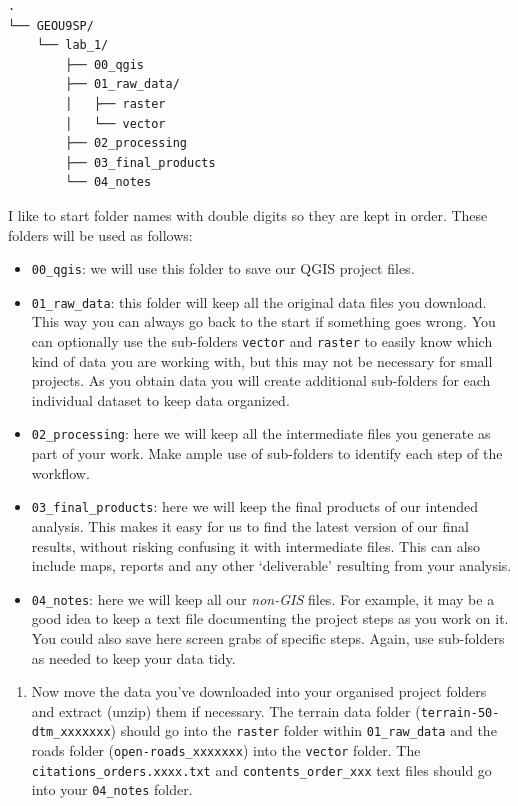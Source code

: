 \documentclass[
  letterpaper,
  DIV=11,
  numbers=noendperiod]{scrreprt}
\providecommand{\tightlist}{%
  \setlength{\itemsep}{0pt}\setlength{\parskip}{0pt}}\usepackage{longtable,booktabs,array}
\begin{document}
\begin{verbatim}
.
└── GEOU9SP/
    └── lab_1/
        ├── 00_qgis
        ├── 01_raw_data/
        │   ├── raster
        │   └── vector
        ├── 02_processing
        ├── 03_final_products
        └── 04_notes
\end{verbatim}

I like to start folder names with double digits so they are kept in
order. These folders will be used as follows:

\begin{itemize}
\item
  \texttt{00\_qgis}: we will use this folder to save our QGIS project
  files.
\item
  \texttt{01\_raw\_data}: this folder will keep all the original data
  files you download. This way you can always go back to the start if
  something goes wrong. You can optionally use the sub-folders
  \texttt{vector} and \texttt{raster} to easily know which kind of data
  you are working with, but this may not be necessary for small
  projects. As you obtain data you will create additional sub-folders
  for each individual dataset to keep data organized.
\item
  \texttt{02\_processing}: here we will keep all the intermediate files
  you generate as part of your work. Make ample use of sub-folders to
  identify each step of the workflow.
\item
  \texttt{03\_final\_products}: here we will keep the final products of
  our intended analysis. This makes it easy for us to find the latest
  version of our final results, without risking confusing it with
  intermediate files. This can also include maps, reports and any other
  `deliverable' resulting from your analysis.
\item
  \texttt{04\_notes}: here we will keep all our \emph{non-GIS} files.
  For example, it may be a good idea to keep a text file documenting the
  project steps as you work on it. You could also save here screen grabs
  of specific steps. Again, use sub-folders as needed to keep your data
  tidy.
\end{itemize}

\begin{enumerate}
\def\labelenumi{(\arabic{enumi})}
\setcounter{enumi}{8}
\tightlist
\item
  Now move the data you've downloaded into your organised project
  folders and extract (unzip) them if necessary. The terrain data folder
  (\texttt{terrain-50-dtm\_xxxxxxx}) should go into the \texttt{raster}
  folder within \texttt{01\_raw\_data} and the roads folder
  (\texttt{open-roads\_xxxxxxx}) into the \texttt{vector} folder. The
  \texttt{citations\_orders.xxxx.txt} and \texttt{contents\_order\_xxx}
  text files should go into your \texttt{04\_notes} folder.
\end{enumerate}
\end{document}
